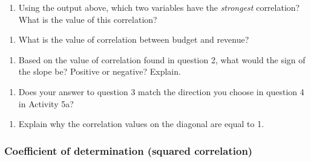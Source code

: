 \documentclass[
]{report}
\providecommand{\tightlist}{%
  \setlength{\itemsep}{0pt}\setlength{\parskip}{0pt}}
\begin{document}
\begin{enumerate}
\def\labelenumi{\arabic{enumi}.}
\tightlist
\item
  Using the output above, which two variables have the \emph{strongest} correlation? What is the value of this correlation?
\end{enumerate}

\vspace{0.5in}

\begin{enumerate}
\def\labelenumi{\arabic{enumi}.}
\setcounter{enumi}{1}
\tightlist
\item
  What is the value of correlation between budget and revenue?
\end{enumerate}

\vspace{0.3in}

\begin{enumerate}
\def\labelenumi{\arabic{enumi}.}
\setcounter{enumi}{2}
\tightlist
\item
  Based on the value of correlation found in question 2, what would the sign of the slope be? Positive or negative? Explain.
\end{enumerate}

\vspace{0.5in}

\begin{enumerate}
\def\labelenumi{\arabic{enumi}.}
\setcounter{enumi}{3}
\tightlist
\item
  Does your answer to question 3 match the direction you choose in question 4 in Activity 5a?
\end{enumerate}

\vspace{0.3in}

\begin{enumerate}
\def\labelenumi{\arabic{enumi}.}
\setcounter{enumi}{4}
\tightlist
\item
  Explain why the correlation values on the diagonal are equal to 1.
\end{enumerate}

\vspace{0.8in}
\newpage

\hypertarget{coefficient-of-determination-squared-correlation}{%
\subsubsection*{Coefficient of determination (squared correlation)}\label{coefficient-of-determination-squared-correlation}}
\end{document}

